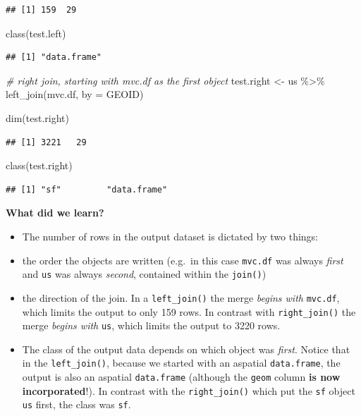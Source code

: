\documentclass[
]{book}
\newenvironment{Shaded}{\begin{snugshade}}{\end{snugshade}}
\newcommand{\AttributeTok}[1]{\textcolor[rgb]{0.77,0.63,0.00}{#1}}
\newcommand{\CommentTok}[1]{\textcolor[rgb]{0.56,0.35,0.01}{\textit{#1}}}
\newcommand{\FunctionTok}[1]{\textcolor[rgb]{0.00,0.00,0.00}{#1}}
\newcommand{\NormalTok}[1]{#1}
\newcommand{\OtherTok}[1]{\textcolor[rgb]{0.56,0.35,0.01}{#1}}
\newcommand{\SpecialCharTok}[1]{\textcolor[rgb]{0.00,0.00,0.00}{#1}}
\newcommand{\StringTok}[1]{\textcolor[rgb]{0.31,0.60,0.02}{#1}}
\providecommand{\tightlist}{%
  \setlength{\itemsep}{0pt}\setlength{\parskip}{0pt}}
\begin{document}
\begin{verbatim}
## [1] 159  29
\end{verbatim}

\begin{Shaded}
\begin{Highlighting}[]
\FunctionTok{class}\NormalTok{(test.left)}
\end{Highlighting}
\end{Shaded}

\begin{verbatim}
## [1] "data.frame"
\end{verbatim}

\begin{Shaded}
\begin{Highlighting}[]
\CommentTok{\# right join, starting with mvc.df as the first object}
\NormalTok{test.right }\OtherTok{\textless{}{-}}\NormalTok{ us }\SpecialCharTok{\%\textgreater{}\%}
  \FunctionTok{left\_join}\NormalTok{(mvc.df, }\AttributeTok{by =} \StringTok{\textquotesingle{}GEOID\textquotesingle{}}\NormalTok{)}

\FunctionTok{dim}\NormalTok{(test.right)}
\end{Highlighting}
\end{Shaded}

\begin{verbatim}
## [1] 3221   29
\end{verbatim}

\begin{Shaded}
\begin{Highlighting}[]
\FunctionTok{class}\NormalTok{(test.right)}
\end{Highlighting}
\end{Shaded}

\begin{verbatim}
## [1] "sf"         "data.frame"
\end{verbatim}

\textbf{What did we learn?}

\begin{itemize}
\tightlist
\item
  The number of rows in the output dataset is dictated by two things:
\item
  the order the objects are written (e.g.~in this case \texttt{mvc.df} was always \emph{first} and \texttt{us} was always \emph{second}, contained within the \texttt{join()})
\item
  the direction of the join. In a \texttt{left\_join()} the merge \emph{begins with} \texttt{mvc.df}, which limits the output to only 159 rows. In contrast with \texttt{right\_join()} the merge \emph{begins with} \texttt{us}, which limits the output to 3220 rows.
\item
  The class of the output data depends on which object was \emph{first}. Notice that in the \texttt{left\_join()}, because we started with an aspatial \texttt{data.frame}, the output is also an aspatial \texttt{data.frame} (although the \texttt{geom} column \textbf{is now incorporated}!). In contrast with the \texttt{right\_join()} which put the \texttt{sf} object \texttt{us} first, the class was \texttt{sf}.
\end{itemize}
\end{document}
